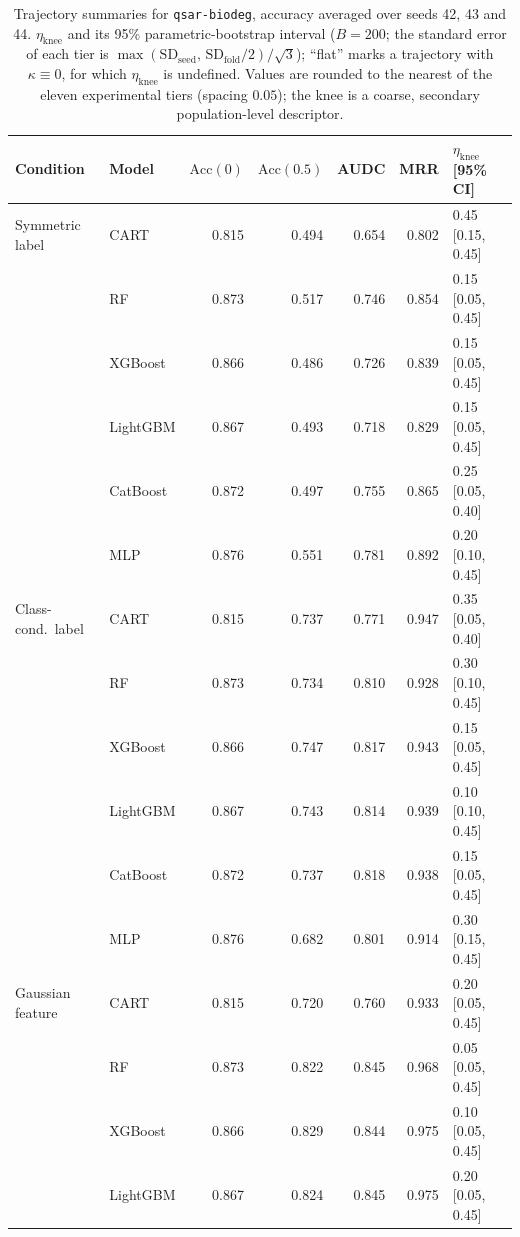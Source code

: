 \begin{table}[p]
\centering
\scriptsize
\setlength{\tabcolsep}{3.5pt}
\caption{Trajectory summaries for \texttt{qsar-biodeg}, accuracy averaged over seeds 42, 43 and 44. $\eta_{\mathrm{knee}}$ and its 95\% parametric-bootstrap interval ($B=200$; the standard error of each tier is $\max(\mathrm{SD}_{\mathrm{seed}},\,\mathrm{SD}_{\mathrm{fold}}/2)/\sqrt3$); ``flat'' marks a trajectory with $\kappa\equiv 0$, for which $\eta_{\mathrm{knee}}$ is undefined. Values are rounded to the nearest of the eleven experimental tiers (spacing $0.05$); the knee is a coarse, secondary population-level descriptor.}
\label{tab:traj_qsar_biodeg}
\begin{tabular}{@{}llrrrrl@{}}
\toprule
Condition & Model & $\mathrm{Acc}(0)$ & $\mathrm{Acc}(0.5)$ & AUDC & MRR & $\eta_{\mathrm{knee}}$ [95\% CI] \\
\midrule
Symmetric label & CART & 0.815 & 0.494 & 0.654 & 0.802 & 0.45 [0.15, 0.45] \\
 & RF & 0.873 & 0.517 & 0.746 & 0.854 & 0.15 [0.05, 0.45] \\
 & XGBoost & 0.866 & 0.486 & 0.726 & 0.839 & 0.15 [0.05, 0.45] \\
 & LightGBM & 0.867 & 0.493 & 0.718 & 0.829 & 0.15 [0.05, 0.45] \\
 & CatBoost & 0.872 & 0.497 & 0.755 & 0.865 & 0.25 [0.05, 0.40] \\
 & MLP & 0.876 & 0.551 & 0.781 & 0.892 & 0.20 [0.10, 0.45] \\
\midrule
Class-cond.\ label & CART & 0.815 & 0.737 & 0.771 & 0.947 & 0.35 [0.05, 0.40] \\
 & RF & 0.873 & 0.734 & 0.810 & 0.928 & 0.30 [0.10, 0.45] \\
 & XGBoost & 0.866 & 0.747 & 0.817 & 0.943 & 0.15 [0.05, 0.45] \\
 & LightGBM & 0.867 & 0.743 & 0.814 & 0.939 & 0.10 [0.10, 0.45] \\
 & CatBoost & 0.872 & 0.737 & 0.818 & 0.938 & 0.15 [0.05, 0.45] \\
 & MLP & 0.876 & 0.682 & 0.801 & 0.914 & 0.30 [0.15, 0.45] \\
\midrule
Gaussian feature & CART & 0.815 & 0.720 & 0.760 & 0.933 & 0.20 [0.05, 0.45] \\
 & RF & 0.873 & 0.822 & 0.845 & 0.968 & 0.05 [0.05, 0.45] \\
 & XGBoost & 0.866 & 0.829 & 0.844 & 0.975 & 0.10 [0.05, 0.45] \\
 & LightGBM & 0.867 & 0.824 & 0.845 & 0.975 & 0.20 [0.05, 0.45] \\

\end{tabular}
\end{table}
